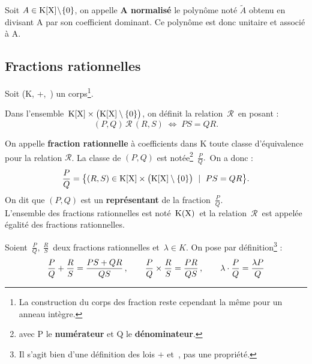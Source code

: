 Soit \(A\in \text{K}[\text{X}]\!\setminus \!\{0\}\), on appelle \textbf{A normalisé} le polynôme noté $\tilde{A}$ obtenu en divisant A par son coefficient dominant. Ce polynôme est donc unitaire et associé à A.

\vspace{2cm}

\subsection{Fractions rationnelles}

\vspace{0.5cm}

\begin{center}
    Soit (K, +,\ \x) un corps\footnote{La construction du corps des fraction reste cependant la même pour un anneau intègre.}.
\end{center}

\vspace{0.5cm}

\noindent Dans l'ensemble $\,\text{K}[\text{X}]\times \bigl(\text{K}[\text{X}]\setminus \{0\}\bigr)$, on définit la relation $\,\mathcal{R}\,$ en posant : \vspace{-0.2cm}
\[(P,Q)\,\mathcal{R}\,(R,S)\; \Leftrightarrow \; PS=QR.\]

\vspace{1cm}

\noindent On appelle \textbf{fraction rationnelle} à coefficients dans K toute classe d'équivalence pour la relation \(\mathcal{R}\). La classe de $(P,Q)$ est notée\footnote{avec P le \textbf{numérateur} et Q le \textbf{dénominateur}.} \(\displaystyle\,\frac{P}{Q}.\,\) On a donc : \vspace{-0.2cm}
\[\frac{P}{Q}=\bigl\{(R,S)\in \poly\times \bigl(\poly\setminus \{0\}\bigr) \ \mid \ PS=QR\bigr\}.\] 
On dit que $(P,Q)$ est un \textbf{représentant} de la fraction \(\,\displaystyle\frac{P}{Q}\). \vspace{0.2cm}\\
L'ensemble des fractions rationnelles est noté $\,\text{K}(\text{X})\,$ et la relation \(\,\mathcal{R}\,\) est appelée égalité des fractions rationnelles.

\vspace{1.4cm}

Soient \(\,\displaystyle \frac{P}{Q},\ \displaystyle\frac{R}{S}\,\) deux fractions rationnelles et $\,\lambda\in K$. On pose par définition\footnote{Il s'agit bien d'une définition des lois $+$ et \x\,, pas une propriété.} :\vspace{-0.2cm}
\[\frac{P}{Q}+ \frac{R}{S}=\frac{PS+QR}{QS}\,,\qquad \frac{P}{Q}\times \frac{R}{S}=\frac{PR}{QS}\,,\qquad\lambda\cdot\frac{P}{Q}=\frac{\lambda P}{Q}\vspace{0.2cm}\]
\newpage

